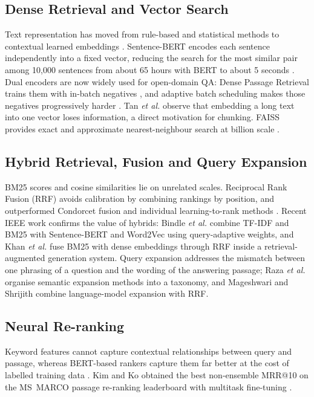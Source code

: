 \documentclass[conference]{IEEEtran}
\begin{document}
\subsection{Dense Retrieval and Vector Search}
Text representation has moved from rule-based and statistical methods to contextual learned
embeddings \cite{patil2023}. Sentence-BERT encodes each sentence independently into a fixed
vector, reducing the search for the most similar pair among 10,000 sentences from about 65 hours
with BERT to about 5 seconds \cite{reimers2019}. Dual encoders are now widely used for
open-domain QA: Dense Passage Retrieval trains them with in-batch negatives
\cite{karpukhin2020}, and adaptive batch scheduling makes those negatives progressively harder
\cite{choi2021}. Tan \emph{et al.} \cite{tan2025} observe that embedding a long text into one
vector loses information, a direct motivation for chunking. FAISS provides exact and approximate
nearest-neighbour search at billion scale \cite{johnson2021}.

\subsection{Hybrid Retrieval, Fusion and Query Expansion}
BM25 scores and cosine similarities lie on unrelated scales. Reciprocal Rank Fusion (RRF) avoids
calibration by combining rankings by position, and outperformed Condorcet fusion and individual
learning-to-rank methods \cite{cormack2009}. Recent IEEE work confirms the value of hybrids:
Bindle \emph{et al.} \cite{bindle2025} combine TF-IDF and BM25 with Sentence-BERT and Word2Vec
using query-adaptive weights, and Khan \emph{et al.} \cite{khan2026} fuse BM25 with dense
embeddings through RRF inside a retrieval-augmented generation system. Query expansion addresses
the mismatch between one phrasing of a question and the wording of the answering passage; Raza
\emph{et al.} \cite{raza2019} organise semantic expansion methods into a taxonomy, and Mageshwari
and Shrijith \cite{mageshwari2026} combine language-model expansion with RRF.

\subsection{Neural Re-ranking}
Keyword features cannot capture contextual relationships between query and passage, whereas
BERT-based rankers capture them far better at the cost of labelled training data
\cite{kim2022}. Kim and Ko obtained the best non-ensemble MRR@10 on the MS~MARCO passage
re-ranking leaderboard with multitask fine-tuning \cite{kim2022}.
\end{document}
